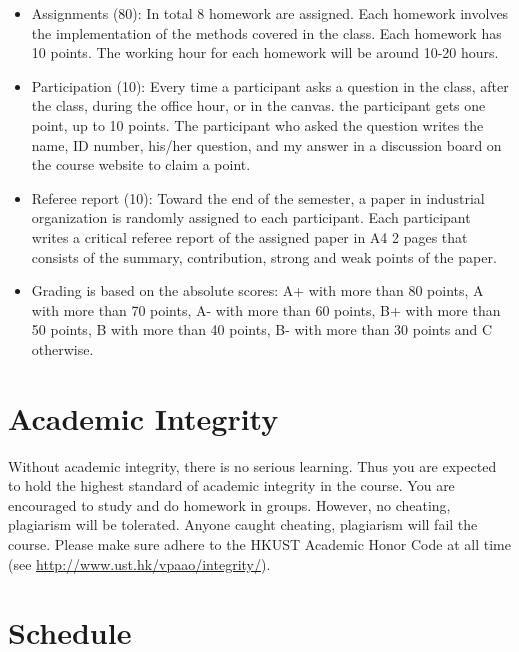 \documentclass[]{book}
\providecommand{\tightlist}{%
  \setlength{\itemsep}{0pt}\setlength{\parskip}{0pt}}
\begin{document}
\begin{itemize}
\tightlist
\item
  Assignments (80): In total 8 homework are assigned. Each homework
  involves the implementation of the methods covered in the class. Each
  homework has 10 points. The working hour for each homework will be
  around 10-20 hours.
\item
  Participation (10): Every time a participant asks a question in the
  class, after the class, during the office hour, or in the canvas. the
  participant gets one point, up to 10 points. The participant who asked
  the question writes the name, ID number, his/her question, and my
  answer in a discussion board on the course website to claim a point.
\item
  Referee report (10): Toward the end of the semester, a paper in
  industrial organization is randomly assigned to each participant. Each
  participant writes a critical referee report of the assigned paper in
  A4 2 pages that consists of the summary, contribution, strong and weak
  points of the paper.
\item
  Grading is based on the absolute scores: A+ with more than 80 points,
  A with more than 70 points, A- with more than 60 points, B+ with more
  than 50 points, B with more than 40 points, B- with more than 30
  points and C otherwise.
\end{itemize}

\section{Academic Integrity}\label{academic-integrity}

Without academic integrity, there is no serious learning. Thus you are
expected to hold the highest standard of academic integrity in the
course. You are encouraged to study and do homework in groups. However,
no cheating, plagiarism will be tolerated. Anyone caught cheating,
plagiarism will fail the course. Please make sure adhere to the HKUST
Academic Honor Code at all time (see
\url{http://www.ust.hk/vpaao/integrity/}).

\section{Schedule}\label{schedule}
\end{document}
